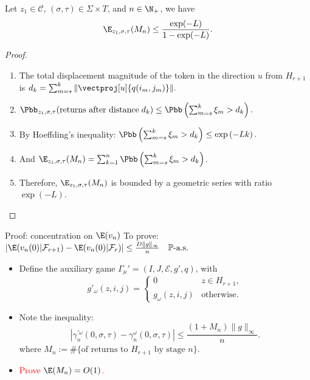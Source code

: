 \begin{frame}
    Let $z_1 \in \mathcal{C}$, $(\sigma, \tau) \in \Sigma \times T$, and $n \in \N_+$, we have
    \begin{equation*}\label{EMn}
      \E_{z_1, \sigma, \tau}(M_n) \leq \frac{\exp(-L)}{1 - \exp(-L)}.
    \end{equation*}

    \begin{proof}
      \begin{enumerate}
        \item The total displacement magnitude of the token in the direction $u$ from $H_{r+1}$ is $
          d_k = \sum_{m=s}^k \|\vectproj[u]{q(i_m, j_m)}\|.$
        \item $\Pbb_{z_1, \sigma, \tau}(\text{returns after distance} \; d_k) \leq \Pbb\left(\sum_{m=s}^k \xi_m > d_k\right).$
        \item By Hoeffding's inequality: $\Pbb\left(\sum_{m=s}^k \xi_m > d_k\right) \leq \exp\left(-Lk\right).$
        \item And $\E_{z_1, \sigma, \tau}(M_n) = \sum_{k = 1}^{n} \Pbb\left(\sum_{m=s}^k \xi_m > d_k\right)$.
        \item Therefore, $\E_{z_1, \sigma, \tau}(M_n)$ is bounded by a geometric series with ratio $\exp(-L)$. 
      \end{enumerate}
    \end{proof}
\end{frame}

\begin{frame}{Proof: concentration on $\E(v_n)$}
  To prove: $|\E (v_n(0)|\mathcal{F}_{r+1}) - \E (v_n(0)|\mathcal{F}_r)| \leq \frac{D\|g\|_{\infty}}{n} \quad \mathbb{P}\text{-a.s.}$
  \vspace{0.5cm}

  \begin{itemize}
    \item Define the auxiliary game $\Gamma_{\mu}' = (I, J, \mathcal{E}, g', q)$, with
    \[
      g'_{\omega}(z, i, j) = \begin{cases}
                                0          &   z \in H_{r+1},\\
                                g_{\omega}(z, i, j) & \text{otherwise} .
                              \end{cases}
    \]
    \item Note the inequality:
    \[
      |\gamma_n^{'\omega}(0, \sigma, \tau) - \gamma_n^{\omega}(0, \sigma, \tau)| \leq \frac{(1+M_n)\|g\|_{\infty}}{n}. 
    \]
    where $M_n := \#\{\text{of returns to } H_{r+1} \text{ by stage } n\}$.
    \item \textcolor{red}{Prove $\E(M_n) = O(1)$.} \textcolor{green}{\checkmark}
  \end{itemize}
\end{frame}

